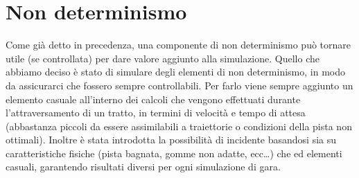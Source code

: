 \section{Non determinismo}

Come già detto in precedenza, una componente di non determinismo può tornare utile (se controllata) per dare valore aggiunto alla simulazione.
Quello che abbiamo deciso è stato di simulare degli elementi di non determinismo, in modo da assicurarci che fossero sempre controllabili.
Per farlo viene sempre aggiunto un elemento casuale all’interno dei calcoli che vengono effettuati durante l’attraversamento di un tratto, in termini di velocità e tempo di attesa (abbastanza piccoli da essere assimilabili a traiettorie o condizioni della pista non ottimali). Inoltre è stata introdotta la possibilità di incidente basandosi sia su caratteristiche fisiche (pista bagnata, gomme non adatte, ecc…) che ed elementi casuali, garantendo risultati diversi per ogni simulazione di gara.



